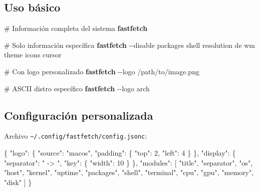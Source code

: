 \documentclass[
  11pt,
  letterpaper,
  oneside,
  openany]{scrbook}
\newenvironment{Shaded}{}{}
\newcommand{\AttributeTok}[1]{\textcolor[rgb]{0.84,0.23,0.29}{#1}}
\newcommand{\CommentTok}[1]{\textcolor[rgb]{0.42,0.45,0.49}{#1}}
\newcommand{\DataTypeTok}[1]{\textcolor[rgb]{0.84,0.23,0.29}{#1}}
\newcommand{\DecValTok}[1]{\textcolor[rgb]{0.00,0.36,0.77}{#1}}
\newcommand{\ExtensionTok}[1]{\textcolor[rgb]{0.84,0.23,0.29}{\textbf{#1}}}
\newcommand{\FunctionTok}[1]{\textcolor[rgb]{0.44,0.26,0.76}{#1}}
\newcommand{\NormalTok}[1]{\textcolor[rgb]{0.14,0.16,0.18}{#1}}
\newcommand{\OtherTok}[1]{\textcolor[rgb]{0.44,0.26,0.76}{#1}}
\newcommand{\StringTok}[1]{\textcolor[rgb]{0.01,0.18,0.38}{#1}}
\begin{document}
\subsection{Uso básico}\label{uso-buxe1sico-4}

\begin{Shaded}
\begin{Highlighting}[]
\CommentTok{\# Información completa del sistema}
\ExtensionTok{fastfetch}

\CommentTok{\# Solo información específica}
\ExtensionTok{fastfetch} \AttributeTok{{-}{-}disable}\NormalTok{ packages shell resolution de wm theme icons cursor}

\CommentTok{\# Con logo personalizado}
\ExtensionTok{fastfetch} \AttributeTok{{-}{-}logo}\NormalTok{ /path/to/image.png}

\CommentTok{\# ASCII distro específico}
\ExtensionTok{fastfetch} \AttributeTok{{-}{-}logo}\NormalTok{ arch}
\end{Highlighting}
\end{Shaded}

\subsection{Configuración
personalizada}\label{configuraciuxf3n-personalizada-2}

Archivo \texttt{\textasciitilde{}/.config/fastfetch/config.jsonc}:

\begin{Shaded}
\begin{Highlighting}[]
\FunctionTok{\{}
    \DataTypeTok{"logo"}\FunctionTok{:} \FunctionTok{\{}
        \DataTypeTok{"source"}\FunctionTok{:} \StringTok{"macos"}\FunctionTok{,}
        \DataTypeTok{"padding"}\FunctionTok{:} \FunctionTok{\{}
            \DataTypeTok{"top"}\FunctionTok{:} \DecValTok{2}\FunctionTok{,}
            \DataTypeTok{"left"}\FunctionTok{:} \DecValTok{4}
        \FunctionTok{\}}
    \FunctionTok{\},}
    \DataTypeTok{"display"}\FunctionTok{:} \FunctionTok{\{}
        \DataTypeTok{"separator"}\FunctionTok{:} \StringTok{" {-}\textgreater{} "}\FunctionTok{,}
        \DataTypeTok{"key"}\FunctionTok{:} \FunctionTok{\{}
            \DataTypeTok{"width"}\FunctionTok{:} \DecValTok{10}
        \FunctionTok{\}}
    \FunctionTok{\},}
    \DataTypeTok{"modules"}\FunctionTok{:} \OtherTok{[}
        \StringTok{"title"}\OtherTok{,}
        \StringTok{"separator"}\OtherTok{,}
        \StringTok{"os"}\OtherTok{,}
        \StringTok{"host"}\OtherTok{,} 
        \StringTok{"kernel"}\OtherTok{,}
        \StringTok{"uptime"}\OtherTok{,}
        \StringTok{"packages"}\OtherTok{,}
        \StringTok{"shell"}\OtherTok{,}
        \StringTok{"terminal"}\OtherTok{,}
        \StringTok{"cpu"}\OtherTok{,}
        \StringTok{"gpu"}\OtherTok{,}
        \StringTok{"memory"}\OtherTok{,}
        \StringTok{"disk"}
    \OtherTok{]}
\FunctionTok{\}}
\end{Highlighting}
\end{Shaded}
\end{document}
